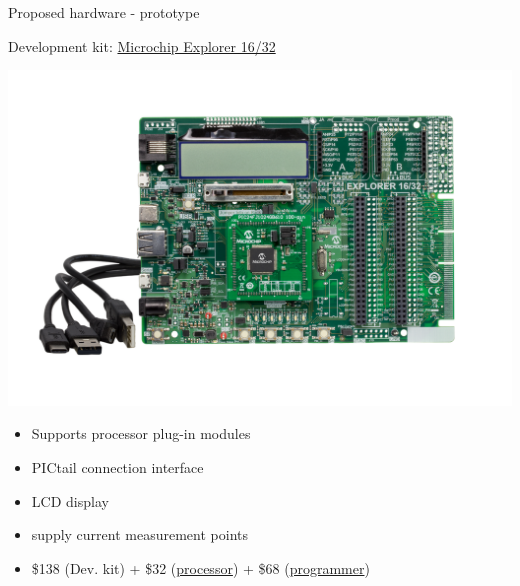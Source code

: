 \documentclass{beamer}
\newcommand{\myhref}[2]{{\color{blue}\href{#1}{#2}}}
\begin{document}
    \begin{frame}{Proposed hardware - prototype}
        
        Development kit: \myhref{http://www.microchip.com/DevelopmentTools/ProductDetails.aspx?PartNO=DM240001-3}{Microchip Explorer 16/32}
        \vspace*{-0.7cm}
        \begin{center}
            \includegraphics[scale=0.2]{figures/microchiptechnologyinc_35116794972.png}
        \end{center}
        \vspace*{-1cm}
        \begin{itemize}
            \item Supports processor plug-in modules
            \item PICtail connection interface
            \item LCD display
            \item supply current measurement points
            \item \$138 (Dev. kit) + \$32 (\myhref{http://www.microchip.com/DevelopmentTools/ProductDetails.aspx?PartNO=MA240023}{processor}) + \$68 (\myhref{https://www.digikey.ca/product-detail/en/microchip-technology/PG164130/PG164130-ND/2171224}{programmer})
        \end{itemize}
    \end{frame}
\end{document}

